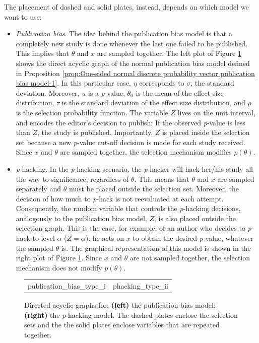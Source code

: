 \documentclass{article}
\theoremstyle{plain}
\theoremstyle{definition}
\begin{document}
The placement of dashed and solid plates, instead, depends on which model we want to use:
\begin{itemize}
\item \textit{Publication bias}. The idea behind the publication bias model is that a completely new study is done whenever the last one failed to be published. This implies that $\theta$ and $x$ are sampled together. The left plot of Figure \ref{fig:Plate notation, publication bias and p-hacking} shows the direct acyclic graph of the normal publication bias model defined in Proposition \ref{prop:One-sided normal discrete probability vector publication bias model-1}. In this particular case, $\eta$ corresponds to $\sigma$, the standard deviation. Moreover, $u$ is a \textit{p}-value, $\theta_{0}$ is the mean of the effect size distribution, $\tau$ is the standard deviation of the effect size distribution, and $\rho$ is the selection probability function. The variable $Z$ lives on the unit interval, and encodes the editor's decision to publish: If the observed \textit{p}-value is less than $Z$, the study is published. Importantly, $Z$ is placed inside the selection set because a new \textit{p}-value cut-off decision is made for each study received. Since $x$ and $\theta$ are sampled together, the selection mechanism modifies $p(\theta)$.%

\item \textit{p}-hacking. In the \textit{p}-hacking scenario, the \textit{p}-hacker will hack her/his study all the way to significance, regardless of $\theta$. This means that $\theta$ and $x$ are sampled separately and $\theta$ must be placed outside the selection set. Moreover, the decision of how much to \textit{p}-hack is not reevaluated at each attempt. Consequently, the random variable that controls the \textit{p}-hacking decisions, analogously to the publication bias model, $Z$, is also placed outside the selection graph. This is the case, for example, of an author who decides to \textit{p}-hack to level $\alpha$ ($Z = \alpha$): he acts on $x$ to obtain the desired \textit{p}-value, whatever the sampled $\theta$ is. The graphical representation of this model is shown in the right plot of Figure \ref{fig:Plate notation, publication bias and p-hacking}. Since $x$ and $\theta$ are not sampled together, the selection mechanism does not modify $p(\theta)$.
\end{itemize}

\begin{figure}
\begin{center}     
 \begin{tabular}{cc}    
  {publication_bias_type_i} &     
  {phacking_type_ii}
 \end{tabular} 
\end{center}
\caption{\label{fig:Plate notation, publication bias and p-hacking} Directed acyclic graphs for: {\bf (left)}
the publication bias model; {\bf (right)} the \textit{p}-hacking model. The dashed plates enclose the selection sets and the the solid plates enclose variables that are repeated together.}
\end{figure}
\end{document}
